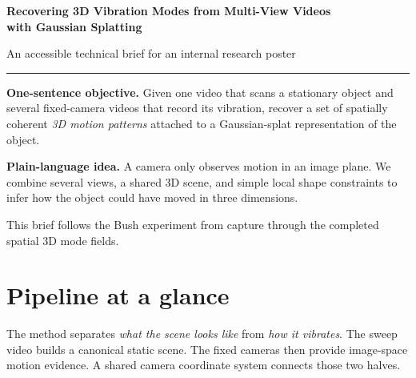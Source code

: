 \documentclass[10pt]{article}
\newcommand{\plainidea}[1]{%
  \vspace{0.25em}
  \noindent\colorbox{SoftGray}{%
    \parbox{\dimexpr\linewidth-2\fboxsep\relax}{%
      \textbf{Plain-language idea.} #1}}
  \vspace{0.25em}
}
\begin{document}
{\Huge\bfseries Recovering 3D Vibration Modes from Multi-View Videos\\
with Gaussian Splatting\par}
\vspace{0.35em}
{\large An accessible technical brief for an internal research poster\par}
\vspace{0.7em}
\hrule
\vspace{0.7em}

\textbf{One-sentence objective.}
Given one video that scans a stationary object and several fixed-camera videos
that record its vibration, recover a set of spatially coherent \emph{3D motion
patterns} attached to a Gaussian-splat representation of the object.

\plainidea{A camera only observes motion in an image plane. We combine several
views, a shared 3D scene, and simple local shape constraints to infer how the
object could have moved in three dimensions.}

This brief follows the Bush experiment from capture through the completed
spatial 3D mode fields.

\section{Pipeline at a glance}

The method separates \emph{what the scene looks like} from \emph{how it
vibrates}. The sweep video builds a canonical static scene. The fixed cameras
then provide image-space motion evidence. A shared camera coordinate system
connects those two halves.
\end{document}
